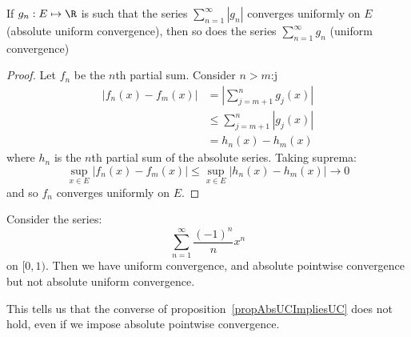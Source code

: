\documentclass[../Main.tex]{subfiles}
\begin{document}
\begin{proposition}
    If $g_n : E \mapsto \R$ is such that the series $\sum_{n = 1}^\infty |g_n|$ converges uniformly on $E$ (absolute uniform convergence), then so does the series $\sum_{n = 1}^\infty g_n$ (uniform convergence)
    \label{propAbsUCImpliesUC}
\end{proposition}
\begin{proof}
    Let $f_n$ be the $n$th partial sum. Consider $n > m$:j
    \begin{align*}
        |f_n(x) - f_m(x)| &= \left| \sum_{j = m+1}^{n}g_j(x) \right| \\
        &\leq \sum_{j = m + 1}^{n} |g_j(x)| \\
        &= h_n(x) - h_m(x)
    \end{align*}
    where $h_n$ is the $n$th partial sum of the absolute series. Taking suprema:
    \begin{equation*}
        \sup_{x \in E} |f_n(x) - f_m(x)| \leq \sup_{x\in E} |h_n(x) - h_m(x)| \to 0
    \end{equation*}
    and so $f_n$ converges uniformly on $E$.
\end{proof}
\begin{example}
    Consider the series:
    \begin{equation*}
        \sum_{n = 1}^\infty \frac{(-1)^n}{n}x^n
    \end{equation*}
    on $[0, 1)$. Then we have uniform convergence, and absolute pointwise convergence but not absolute uniform convergence.
\end{example}
\begin{remark}
    This tells us that the converse of proposition~\ref{propAbsUCImpliesUC} does not hold, even if we impose absolute pointwise convergence.
\end{remark}
\end{document}
